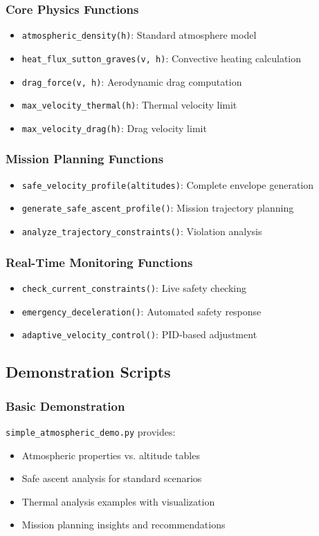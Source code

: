 \documentclass[12pt,a4paper]{article}
\begin{document}
\subsubsection{Core Physics Functions}
\begin{itemize}
\item \texttt{atmospheric\_density(h)}: Standard atmosphere model
\item \texttt{heat\_flux\_sutton\_graves(v, h)}: Convective heating calculation
\item \texttt{drag\_force(v, h)}: Aerodynamic drag computation
\item \texttt{max\_velocity\_thermal(h)}: Thermal velocity limit
\item \texttt{max\_velocity\_drag(h)}: Drag velocity limit
\end{itemize}

\subsubsection{Mission Planning Functions}
\begin{itemize}
\item \texttt{safe\_velocity\_profile(altitudes)}: Complete envelope generation
\item \texttt{generate\_safe\_ascent\_profile()}: Mission trajectory planning
\item \texttt{analyze\_trajectory\_constraints()}: Violation analysis
\end{itemize}

\subsubsection{Real-Time Monitoring Functions}
\begin{itemize}
\item \texttt{check\_current\_constraints()}: Live safety checking
\item \texttt{emergency\_deceleration()}: Automated safety response
\item \texttt{adaptive\_velocity\_control()}: PID-based adjustment
\end{itemize}

\subsection{Demonstration Scripts}

\subsubsection{Basic Demonstration}
\texttt{simple\_atmospheric\_demo.py} provides:
\begin{itemize}
\item Atmospheric properties vs. altitude tables
\item Safe ascent analysis for standard scenarios
\item Thermal analysis examples with visualization
\item Mission planning insights and recommendations
\end{itemize}
\end{document}
